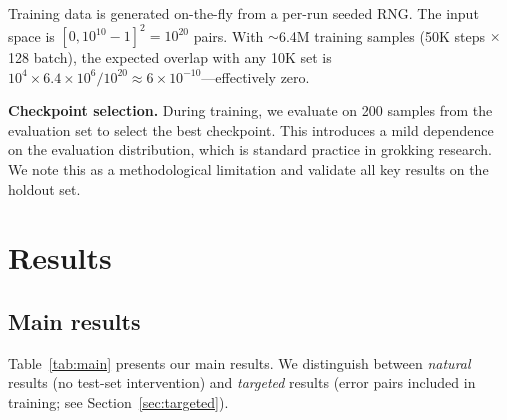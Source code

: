 \documentclass[11pt]{article}
\begin{document}
Training data is generated on-the-fly from a per-run seeded RNG. The
input space is $[0, 10^{10}-1]^2 = 10^{20}$ pairs. With $\sim$6.4M
training samples (50K steps $\times$ 128 batch), the expected overlap
with any 10K set is $10^4 \times 6.4 \times 10^6 / 10^{20} \approx
6 \times 10^{-10}$---effectively zero.

\textbf{Checkpoint selection.} During training, we evaluate on 200
samples from the evaluation set to select the best checkpoint. This
introduces a mild dependence on the evaluation distribution, which is
standard practice in grokking research. We note this as a methodological
limitation and validate all key results on the holdout set.

\section{Results}
\label{sec:results}

\subsection{Main results}

Table~\ref{tab:main} presents our main results. We distinguish between
\emph{natural} results (no test-set intervention) and \emph{targeted}
results (error pairs included in training; see
Section~\ref{sec:targeted}).
\end{document}
